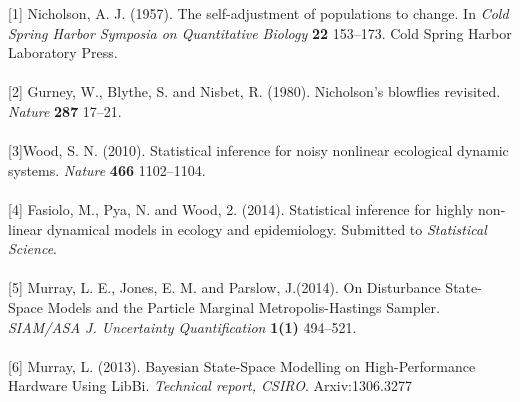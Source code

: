 \documentclass{article}
\begin{document}
[1] Nicholson, A. J. (1957). The self-adjustment of populations to change. In \textit{Cold      Spring Harbor Symposia on Quantitative Biology} \textbf{22} 153–173. Cold Spring Harbor Laboratory Press. \\ \\{}
[2] Gurney, W., Blythe, S. and Nisbet, R. (1980). Nicholson’s blowflies revisited. \textit{Nature} \textbf{287} 17–21.\\ \\{}
[3]{\large Wood, S. N. (2010).} Statistical inference for noisy nonlinear ecological dynamic systems. \textit{Nature} \textbf{466} 1102–1104.\\ \\{}
[4] Fasiolo, M., Pya, N. and Wood, 2. (2014). Statistical inference for highly non-linear dynamical models in ecology and epidemiology. Submitted to \textit{Statistical Science}. \\ \\{}
[5] Murray, L. E., Jones, E. M. and Parslow, J.(2014). On Disturbance State-Space Models and the Particle Marginal Metropolis-Hastings Sampler. \textit{SIAM/ASA J. Uncertainty Quantification}  \textbf{1(1)} 494–521. \\ \\{}
[6] Murray, L. (2013). Bayesian State-Space Modelling on High-Performance Hardware Using LibBi. \textit{Technical report, CSIRO}. Arxiv:1306.3277
\end{document}
